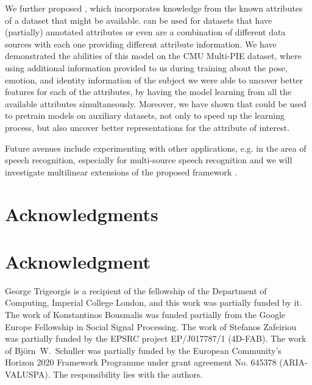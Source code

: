 \documentclass[10pt,journal,compsoc]{IEEEtran}
\begin{document}
We further proposed \dwsf{}, which incorporates knowledge from the known attributes of a dataset that might be available. \dwsf can be used for datasets that have (partially) annotated attributes or even are a combination of different data sources with each one providing different attribute information. We have demonstrated the abilities of this model on the CMU Multi-PIE dataset, where using additional information provided to us during training about the pose, emotion, and identity information of the subject we were able to uncover better features for each of the attributes, by having the model learning from all the available attributes simultaneously. Moreover, we have shown that \dwsf{} could be used to pretrain models on auxiliary datasets, not only to speed up the learning process, but also uncover better representations for the attribute of interest.

Future avenues include experimenting with other applications, e.g. in the area of speech recognition, especially for multi-source speech recognition and we will investigate multilinear extensions of the proposed framework \cite{zafeiriou2009discriminant,zafeiriou2009algorithms}.


\ifCLASSOPTIONcompsoc
  \section*{Acknowledgments}
\else
  \section*{Acknowledgment}
\fi


\label{sec:acknowledgements}
George Trigeorgis is a recipient of the fellowship of the Department of Computing, Imperial College London, and this work was partially funded by it. The work of Konstantinos Bousmalis was funded partially from the Google Europe Fellowship in Social Signal Processing. The work of Stefanos Zafeiriou was partially funded by the EPSRC project EP/J017787/1 (4D-FAB). The work of Bj\"orn~W.~Schuller was partially funded by the European Community's Horizon 2020 Framework Programme under grant agreement No. 645378 (ARIA-VALUSPA). The responsibility lies with
the authors.

\ifCLASSOPTIONcaptionsoff
  \newpage
\fi
\end{document}
